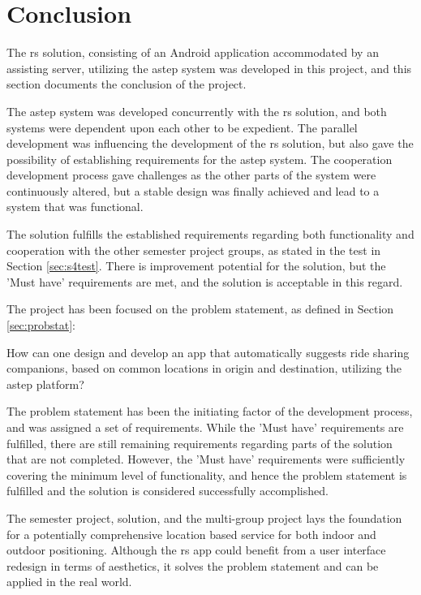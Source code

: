 \section{Conclusion}
The \gls{rs} solution, consisting of an Android application accommodated by an assisting server, utilizing the \gls{astep} system was developed in this project, and this section documents the conclusion of the project.


The \gls{astep} system was developed concurrently with the \gls{rs} solution, and both systems were dependent upon each other to be expedient.
The parallel development was influencing the development of the \gls{rs} solution, but also gave the possibility of establishing requirements for the \gls{astep} system.
The cooperation development process gave challenges as the other parts of the system were continuously altered, but a stable design was finally achieved and lead to a system that was functional.


The solution fulfills the established requirements regarding both functionality and cooperation with the other semester project groups, as stated in the test in Section \ref{sec:s4test}.
There is improvement potential for the solution, but the 'Must have' requirements are met, and the solution is acceptable in this regard.


The project has been focused on the problem statement, as defined in Section \ref{sec:probstat}:

{\addtolength{\leftskip}{10mm}\addtolength{\rightskip}{10mm}\noindent\hrulefill\it
	
	\noindent How can one design and develop an app that automatically suggests ride sharing companions, based on common locations in origin and destination, utilizing the \gls{astep} platform? 
	
	\noindent\hrulefill
	
}

The problem statement has been the initiating factor of the development process, and was assigned a set of requirements.
While the 'Must have' requirements are fulfilled, there are still remaining requirements regarding parts of the solution that are not completed.
However, the 'Must have' requirements were sufficiently covering the minimum level of functionality, and hence the problem statement is fulfilled and the solution is considered successfully accomplished.


The semester project, solution, and the multi-group project lays the foundation for a potentially comprehensive location based service for both indoor and outdoor positioning.
Although the \gls{rs} app could benefit from a user interface redesign in terms of aesthetics, it solves the problem statement and can be applied in the real world.